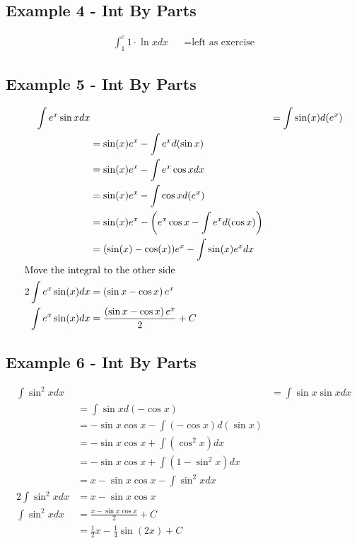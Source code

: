 \subsection{Example 4 - Int By Parts}
\begin{align}
  \int_1^e 1\cdot\ln x dx &
  &= \text{left as exercise}
\end{align}

\subsection{Example 5 - Int By Parts}
\begin{align}
  \int e^x \sin x dx &
  &= \int \sin(x) d(e^x) \\
  &= \sin(x)e^x - \int e^x d(\sin x) \\
  &= \sin(x)e^x - \int e^x \cos x dx \\
  &= \sin(x)e^x - \int \cos x d(e^x) \\
  &= \sin(x)e^x - \left(e^x\cos x -\int e^x d(\cos x) \right) \\
  &= (\sin(x) - \cos(x))e^x - \int \sin(x)e^x dx \\
  \intertext{Move the integral to the other side}
  2 \int e^x \sin(x) dx &= \left( \sin x - \cos x \right)e^x \\
  \int e^x \sin(x) dx &= \frac{\left( \sin x - \cos x \right)e^x}{2} + C
\end{align}

\subsection{Example 6 - Int By Parts}
\begin{align}
  \int \sin^2 x dx &
  &= \int \sin x \sin x dx \\
  &= \int \sin x d(-\cos x) \\
  &= -\sin x \cos x - \int(-\cos x) d(\sin x) \\
  &= -\sin x \cos x + \int(\cos^2x) dx \\
  &= -\sin x \cos x + \int (1-\sin^2x) dx \\
  &= x- \sin x \cos x - \int \sin^2 x dx \\
  2 \int \sin^2 x dx &= x - \sin x \cos x \\
  \int \sin^2 x dx &= \frac{x - \sin x \cos x}{2} + C \\
  &= \frac{1}{2}x - \frac{1}{4}\sin(2x) + C
\end{align}
